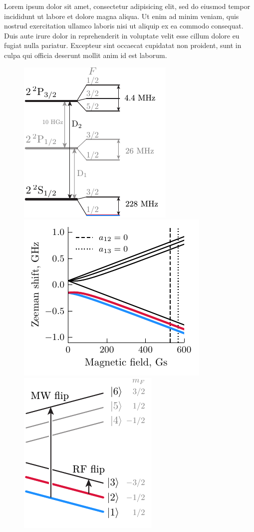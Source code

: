 Lorem ipsum dolor sit amet, consectetur adipisicing elit, sed do eiusmod
tempor incididunt ut labore et dolore magna aliqua. Ut enim ad minim veniam,
quis nostrud exercitation ullamco laboris nisi ut aliquip ex ea commodo
consequat. Duis aute irure dolor in reprehenderit in voluptate velit esse
cillum dolore eu fugiat nulla pariatur. Excepteur sint occaecat cupidatat non
proident, sunt in culpa qui officia deserunt mollit anim id est laborum.


\begin{figure}
    \centering
    \includegraphics{fig-ai/li-levels-base.pdf}
    \hfill
    \includegraphics{fig-py/li6-zeeman.pdf}
    \hfill
    \includegraphics{fig-ai/li-levels.pdf}

\end{figure}
